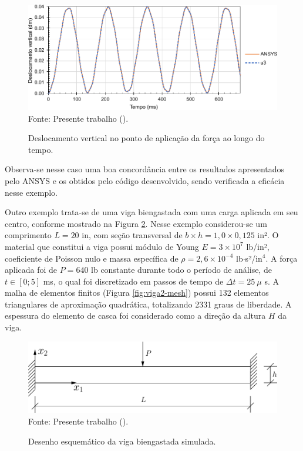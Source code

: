 \begin{figure}[h!]
    \centering
    \caption{Deslocamento vertical no ponto de aplicação da força ao longo do tempo.}
    \includegraphics[width=\linewidth]{Figuras/vigas/res1.pdf}
    \\Fonte: Presente trabalho (\the\year).
    \label{fig:res-viga1}
\end{figure}

Observa-se nesse caso uma boa concordância entre os resultados apresentados pelo ANSYS e os obtidos pelo código desenvolvido, sendo verificada a eficácia nesse exemplo.

Outro exemplo trata-se de uma viga biengastada com uma carga aplicada em seu centro, conforme mostrado na Figura \ref{fig:viga2}. Nesse exemplo considerou-se um comprimento $L=20$ in, com seção transversal de $b\times h=1,0\times0,125$ in². O material que constitui a viga possui módulo de Young $E=3\times10^{7}$ lb/in², coeficiente de Poisson nulo e massa específica de $\rho=2,6\times10^{-4}$ lb$\cdot$s²/in$^4$. A força aplicada foi de $P=640$ lb constante durante todo o período de análise, de $t\in[0;5]$ ms, o qual foi discretizado em passos de tempo de $\Delta t=25\ \mu$ s. A malha de elementos finitos (Figura \ref{fig:viga2-mesh}) possui 132 elementos triangulares de aproximação quadrática, totalizando 2331 graus de liberdade. A espessura do elemento de casca foi considerado como a direção da altura $H$ da viga.

\begin{figure}[h!]
    \centering
    \caption{Desenho esquemático da viga biengastada simulada.}
    \includegraphics[width=0.6\linewidth]{Figuras/vigas/viga2.pdf}
    \\Fonte: Presente trabalho (\the\year).
    \label{fig:viga2}
\end{figure}


